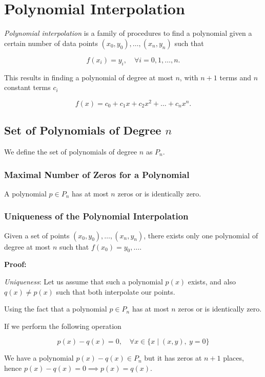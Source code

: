  \chapter{Polynomial Interpolation}

\emph{Polynomial interpolation} is a family of procedures to find a polynomial given 
a certain number of data points \((x_0, y_0), \dots, (x_n, y_n)\) such that 

\[
    f(x_i) = y_i, \quad \forall i = 0, 1, \dots, n.
\]

This results in finding a polynomial of degree at most \(n\), with \(n + 1\) terms and \(n\) constant terms \(c_i\)

\[
    f(x) = c_0 + c_1 x + c_2 x^2 + \dots + c_{n}x^n.
\]

\section{Set of Polynomials of Degree \texorpdfstring{\(n\)}{n}}

We define the set of polynomials of degree \(n\) as \(P_n\).

\subsection{Maximal Number of Zeros for a Polynomial}

A polynomial \(p \in P_n\) has at most \(n\) zeros or is identically zero.

\subsection{Uniqueness of the Polynomial Interpolation}

Given a set of points \((x_0, y_0), \dots, (x_n, y_n)\), there exists only one polynomial of degree at most \(n\) 
such that \(f(x_0) = y_0, \dots\).

\textbf{Proof:}

\emph{Uniqueness}: Let us assume that such a polynomial \(p(x)\) exists, and also \(q(x) \ne p(x)\) such that both interpolate our 
points.

Using the fact that a polynomial \(p \in P_n\) has at most \(n\) zeros or is identically zero.

If we perform the following operation

\[
    p(x) - q(x) = 0, \quad \forall x \in \{x \mid (x, y), \ y = 0\}
\]

We have a polynomial \(p(x) - q(x) \in P_n\) but it has zeros at \(n + 1\) places, hence \(p(x) - q(x) = 0 \implies p(x) = q(x)\).

